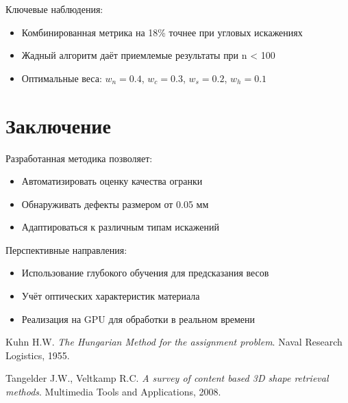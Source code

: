 \documentclass[a4paper,12pt]{article}
\begin{document}
Ключевые наблюдения:
\begin{itemize}
    \item Комбинированная метрика на 18\% точнее при угловых искажениях
    \item Жадный алгоритм даёт приемлемые результаты при n < 100
    \item Оптимальные веса: $w_n=0.4$, $w_c=0.3$, $w_s=0.2$, $w_h=0.1$
\end{itemize}

\section{Заключение}
Разработанная методика позволяет:
\begin{itemize}
    \item Автоматизировать оценку качества огранки
    \item Обнаруживать дефекты размером от 0.05 мм
    \item Адаптироваться к различным типам искажений
\end{itemize}

Перспективные направления:
\begin{itemize}
    \item Использование глубокого обучения для предсказания весов
    \item Учёт оптических характеристик материала
    \item Реализация на GPU для обработки в реальном времени
\end{itemize}

\begin{thebibliography}{9}
Kuhn H.W. 
\textit{The Hungarian Method for the assignment problem}. 
Naval Research Logistics, 1955.

Tangelder J.W., Veltkamp R.C. 
\textit{A survey of content based 3D shape retrieval methods}. 
Multimedia Tools and Applications, 2008.
\end{thebibliography}
\end{document}
